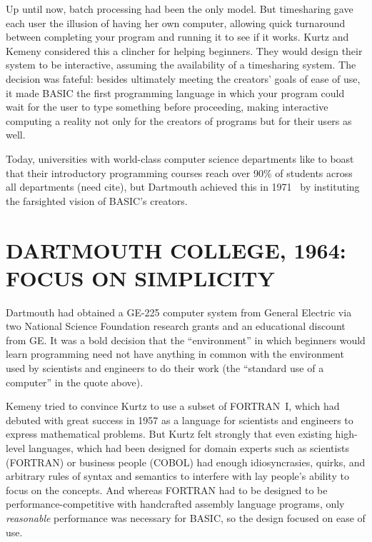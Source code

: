 \documentclass{article}
\begin{document}
Up until now, batch processing had been the only model.
But timesharing gave each user the illusion of having her own computer,
allowing quick turnaround between completing your program and running
it to see if it works.
Kurtz and Kemeny considered this a clincher for helping beginners.
They would design their system to be
interactive, assuming the availability of a timesharing system.  The
decision was fateful: besides ultimately meeting the creators' goals
of ease of use, it made BASIC the first programming language in which
your program could wait for the user to type something before
proceeding, making interactive computing a reality not only for the
creators of programs but for their users as well.

Today, universities with world-class computer science
departments like to boast that their introductory programming courses
reach over 90\% of
students across all departments (need cite), but
Dartmouth achieved this in 1971~\cite{man_and_computer} by instituting the farsighted 
vision of BASIC's creators.

\section{DARTMOUTH COLLEGE, 1964: FOCUS ON SIMPLICITY}



Dartmouth had obtained a GE-225 computer system from General Electric
via two National Science Foundation research grants and
an educational discount from GE.  It was a bold decision that the
``environment'' in which beginners would learn programming need not have
anything in common with the environment used by scientists and engineers
to do their work (the ``standard use of a computer'' in the quote above).


Kemeny tried to convince Kurtz to use a subset of FORTRAN~I, which had
debuted with great success in 1957 as a language for scientists and
engineers to express mathematical problems.  
But Kurtz felt strongly that even existing high-level
languages, which had been designed for domain experts such as scientists
(FORTRAN) or business people (COBOL) 
had enough idiosyncrasies, quirks, and arbitrary rules of syntax and
semantics to interfere with lay people's ability to focus on the
concepts.  
And whereas FORTRAN had to be designed to be performance-competitive with
handcrafted assembly language programs, 
only \emph{reasonable} performance was necessary for BASIC, so the
design focused on 
ease of use.
\end{document}
